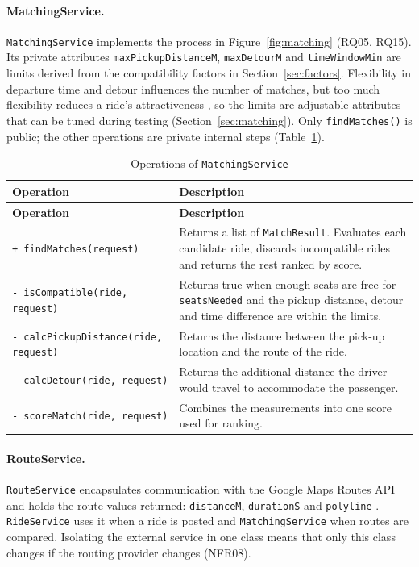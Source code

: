{\paragraph{MatchingService.} \texttt{MatchingService} implements the process in Figure~\ref{fig:matching} (RQ05, RQ15). Its private attributes \texttt{maxPickupDistanceM}, \texttt{maxDetourM} and \texttt{timeWindowMin} are limits derived from the compatibility factors in Section~\ref{sec:factors}. Flexibility in departure time and detour influences the number of matches, but too much flexibility reduces a ride's attractiveness \citep{stiglic2016}, so the limits are adjustable attributes that can be tuned during testing (Section~\ref{sec:matching}). Only \texttt{findMatches()} is public; the other operations are private internal steps (Table~\ref{tab:matchingops}).

\begin{longtable}{@{}>{\raggedright\arraybackslash}p{}
                   >{\raggedright\arraybackslash}p{}@{}}
\caption{Operations of \texttt{MatchingService}}\label{tab:matchingops}\\
\toprule
\textbf{Operation} & \textbf{Description} \\
\midrule
\endfirsthead
\toprule
\textbf{Operation} & \textbf{Description} \\
\midrule
\endhead
\bottomrule
\endfoot
\texttt{+ findMatches(request)} & Returns a list of \texttt{MatchResult}. Evaluates each candidate ride, discards incompatible rides and returns the rest ranked by score. \\
\texttt{- isCompatible(ride, request)} & Returns true when enough seats are free for \texttt{seatsNeeded} and the pickup distance, detour and time difference are within the limits. \\
\texttt{- calcPickupDistance(ride, request)} & Returns the distance between the pick-up location and the route of the ride. \\
\texttt{- calcDetour(ride, request)} & Returns the additional distance the driver would travel to accommodate the passenger. \\
\texttt{- scoreMatch(ride, request)} & Combines the measurements into one score used for ranking. \\
\end{longtable}

\paragraph{RouteService.} \texttt{RouteService} encapsulates communication with the Google Maps Routes API and holds the route values returned: \texttt{distanceM}, \texttt{durationS} and \texttt{polyline} \citep{google2026a}. \texttt{RideService} uses it when a ride is posted and \texttt{MatchingService} when routes are compared. Isolating the external service in one class means that only this class changes if the routing provider changes (NFR08).

}
